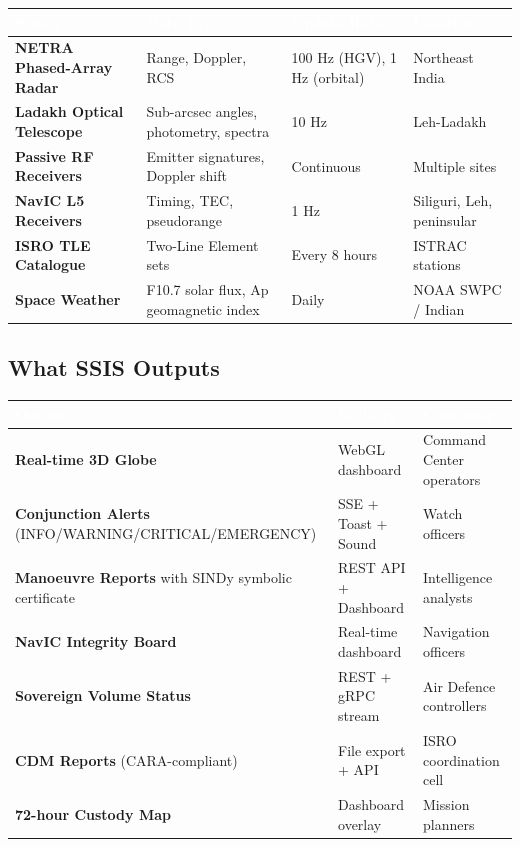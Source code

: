 \documentclass[11pt,a4paper]{article}
\newcommand{\TH}[1]{\textcolor{white}{\textbf{#1}}}
\begin{document}
\begin{table}[H]\centering\small
\begin{tabularx}{\textwidth}{|p{4cm}|X|p{3.2cm}|p{2.8cm}|}
\hline
\rowcolor{dblue}\TH{Sensor} & \TH{Data Type} & \TH{Update Rate} & \TH{Location} \\
\hline
\textbf{NETRA Phased-Array Radar} & Range, Doppler, RCS & 100 Hz (HGV), 1 Hz (orbital) & Northeast India \\
\hline
\textbf{Ladakh Optical Telescope} & Sub-arcsec angles, photometry, spectra & 10 Hz & Leh-Ladakh \\
\hline
\textbf{Passive RF Receivers} & Emitter signatures, Doppler shift & Continuous & Multiple sites \\
\hline
\textbf{NavIC L5 Receivers} & Timing, TEC, pseudorange & 1 Hz & Siliguri, Leh, peninsular \\
\hline
\textbf{ISRO TLE Catalogue} & Two-Line Element sets & Every 8 hours & ISTRAC stations \\
\hline
\textbf{Space Weather} & F10.7 solar flux, Ap geomagnetic index & Daily & NOAA SWPC / Indian \\
\hline
\end{tabularx}
\end{table}

\subsection{What SSIS Outputs}
\begin{table}[H]\centering\small
\begin{tabularx}{\textwidth}{|p{5cm}|p{3.5cm}|X|}
\hline
\rowcolor{dblue}\TH{Output} & \TH{Delivery} & \TH{Consumer} \\
\hline
\textbf{Real-time 3D Globe} & WebGL dashboard & Command Center operators \\
\hline
\textbf{Conjunction Alerts} (INFO/WARNING/CRITICAL/EMERGENCY) & SSE + Toast + Sound & Watch officers \\
\hline
\textbf{Manoeuvre Reports} with SINDy symbolic certificate & REST API + Dashboard & Intelligence analysts \\
\hline
\textbf{NavIC Integrity Board} & Real-time dashboard & Navigation officers \\
\hline
\textbf{Sovereign Volume Status} & REST + gRPC stream & Air Defence controllers \\
\hline
\textbf{CDM Reports} (CARA-compliant) & File export + API & ISRO coordination cell \\
\hline
\textbf{72-hour Custody Map} & Dashboard overlay & Mission planners \\
\hline
\end{tabularx}
\end{table}
\end{document}
